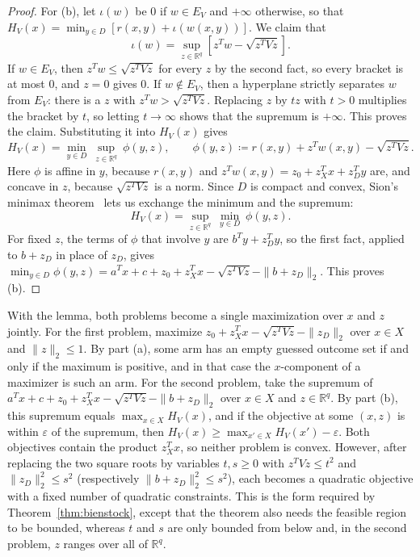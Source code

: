 {\begin{proof}
For (b), let $\iota(w)$ be $0$ if $w\in E_V$ and $+\infty$ otherwise, so
that $H_V(x)=\min_{y\in D}\left[r(x,y)+\iota(w(x,y))\right]$. We claim
that
\begin{equation*}
\iota(w)=\sup_{z\in\mathbb{R}^q}\left[z^Tw-\sqrt{z^TVz}\right] .
\end{equation*}
If $w\in E_V$, then $z^Tw\le\sqrt{z^TVz}$ for every $z$ by the second
fact, so every bracket is at most $0$, and $z=0$ gives $0$. If
$w\notin E_V$, then a hyperplane strictly separates $w$ from $E_V$: there
is a $z$ with $z^Tw>\sqrt{z^TVz}$. Replacing $z$ by $tz$ with $t>0$
multiplies the bracket by $t$, so letting $t\to\infty$ shows that the
supremum is $+\infty$. This proves the claim.
Substituting it into $H_V(x)$ gives
\begin{equation*}
H_V(x)=\min_{y\in D}\ \sup_{z\in\mathbb{R}^q}\ \phi(y,z),
\qquad
\phi(y,z)\coloneqq r(x,y)+z^Tw(x,y)-\sqrt{z^TVz} .
\end{equation*}
Here $\phi$ is affine in $y$, because $r(x,y)$ and
$z^Tw(x,y)=z_0+z_X^Tx+z_D^Ty$ are, and concave in $z$, because
$\sqrt{z^TVz}$ is a norm. Since $D$ is compact and convex, Sion's minimax
theorem~\citep{sion1958minimax} lets us exchange the minimum and the
supremum:
\begin{equation*}
H_V(x)=\sup_{z\in\mathbb{R}^q}\ \min_{y\in D}\ \phi(y,z) .
\end{equation*}
For fixed $z$, the terms of $\phi$ that involve $y$ are $b^Ty+z_D^Ty$,
so the first fact, applied to $b+z_D$ in place of $z_D$, gives
$\min_{y\in D}\phi(y,z)=a^Tx+c+z_0+z_X^Tx-\sqrt{z^TVz}-\|b+z_D\|_2$.
This proves (b).
\end{proof}

With the lemma, both problems become a single maximization over $x$ and
$z$ jointly. For the first problem, maximize
$z_0+z_X^Tx-\sqrt{z^TVz}-\|z_D\|_2$ over $x\in X$ and $\|z\|_2\le1$. By
part (a), some arm has an empty guessed outcome set if and only if the
maximum is positive, and in that case the $x$-component of a maximizer
is such an arm. For the second problem, take the supremum of
$a^Tx+c+z_0+z_X^Tx-\sqrt{z^TVz}-\|b+z_D\|_2$ over $x\in X$ and
$z\in\mathbb{R}^q$. By part (b), this supremum equals
$\max_{x\in X}H_V(x)$, and if the objective at some $(x,z)$ is within
$\varepsilon$ of the supremum, then $H_V(x)\ge\max_{x'\in X}H_V(x')-\varepsilon$.
Both objectives contain the product $z_X^Tx$, so neither problem is
convex. However, after replacing the two square roots by variables
$t,s\ge0$ with $z^TVz\le t^2$ and $\|z_D\|_2^2\le s^2$ (respectively
$\|b+z_D\|_2^2\le s^2$), each becomes a quadratic objective with a fixed
number of quadratic constraints. This is the form required by
Theorem~\ref{thm:bienstock}, except that the theorem also needs the
feasible region to be bounded, whereas $t$ and $s$ are only bounded from
below and, in the second problem, $z$ ranges over all of $\mathbb{R}^q$.

}
